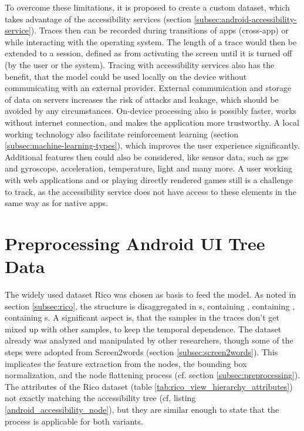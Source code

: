 To overcome these limitations, it is proposed to create a custom dataset, which takes advantage of the accessibility services (section \ref{subsec:android-accessibility-service}).
Traces then can be recorded during transitions of apps (cross-app) or while interacting with the operating system.
The length of a trace would then be extended to a session, defined as from activating the screen until it is turned off (by the user or the system).
Tracing with accessibility services also has the benefit, that the model could be used locally on the device without communicating with an external provider.
External communication and storage of data on servers increases the risk of attacks and leakage, which should be avoided by any circumstances.
On-device processing also is possibly faster, works without internet connection, and makes the application more trustworthy.
A local working technology also facilitate reinforcement learning (section \ref{subsec:machine-learning-types}), which improves the user experience significantly.
Additional features then could also be considered, like sensor data, such as \gls{gps} and gyroscope, acceleration, temperature, light and many more.
A user working with web applications and or playing directly rendered games still is a challenge to track, as the accessibility service does not have access to these elements in the same way as for native apps.


\section{Preprocessing Android UI Tree Data}

The widely used dataset Rico was chosen as basis to feed the model.
As noted in section \ref{subsec:rico}, the structure is disaggregated in s, containing , containing , containing s.
A significant aspect is, that the samples in the traces don't get mixed up with other samples, to keep the temporal dependence.
The dataset already was analyzed and manipulated by other researchers, though some of the steps were adopted from Screen2words (section \ref{subsec:screen2words}).
This implicates the feature extraction from the nodes, the bounding box normalization, and the node flattening process (cf. section \ref{subsec:preprocessing}).
The attributes of the Rico dataset (table \ref{tab:rico_view_hierarchy_attributes}) not exactly matching the accessibility tree (cf. listing \ref{android_accessibility_node}), but they are similar enough to state that the process is applicable for both variants.

